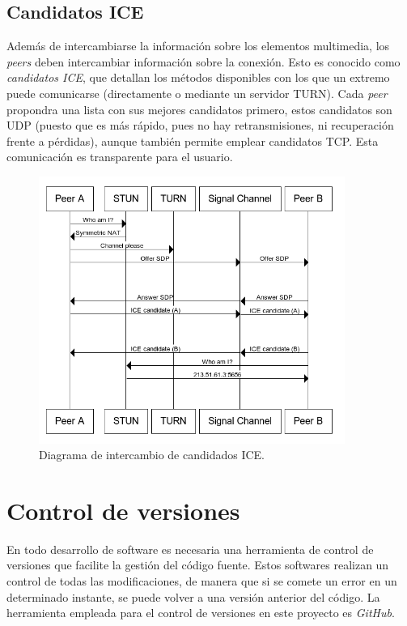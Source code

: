 \documentclass[a4paper, 12pt]{book}
\begin{document}
\subsection{Candidatos ICE}
\label{subsec:candidatos_ice}

Además de intercambiarse la información sobre los elementos multimedia, los \textit{peers} deben intercambiar información sobre la conexión. Esto es conocido como \textit{candidatos ICE}, que detallan los métodos disponibles con los que un extremo puede comunicarse (directamente o mediante un servidor TURN). Cada \textit{peer} propondra una lista con sus mejores candidatos primero, estos candidatos son UDP (puesto que es más rápido, pues no hay retransmisiones, ni recuperación frente a pérdidas), aunque también permite emplear candidatos TCP. Esta comunicación es transparente para el usuario.

\begin{figure}[H]
	\centering
    \includegraphics[width=10cm]{img/ice_diagram.png}
    \caption{Diagrama de intercambio de candidados ICE.}
    \label{figura:nocss_vs_css}
\end{figure}

\section{Control de versiones}
\label{sec:control-de-versiones}

En todo desarrollo de software es necesaria una herramienta de control de versiones que facilite la gestión del código fuente. Estos softwares realizan un control de todas las modificaciones, de manera que si se comete un error en un determinado instante, se puede volver a una versión anterior del código. La herramienta empleada para el control de versiones en este proyecto es \emph{GitHub}.
\end{document}
